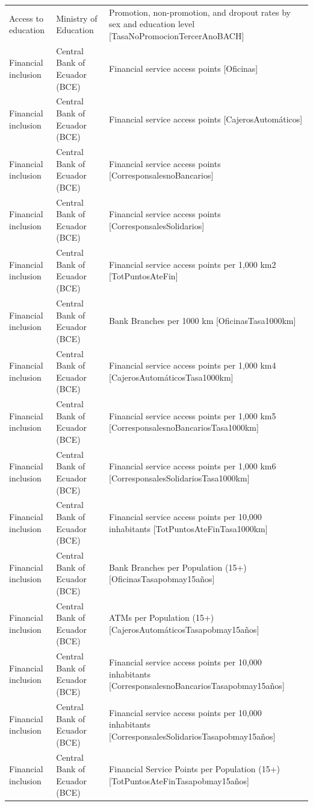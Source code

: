 \documentclass[10pt,a4paper]{article}
\begin{document}
\begin{longtable}{@{}>{\raggedright\arraybackslash}p{3.5cm}>{\raggedright\arraybackslash}p{5.6cm}>{\raggedright\arraybackslash}p{\dimexpr\textwidth-9.1cm-4\tabcolsep\relax}@{}}
Access to education & Ministry of Education & Promotion, non-promotion, and dropout rates by sex and education level [TasaNoPromocionTercerAnoBACH]\\
Financial inclusion & Central Bank of Ecuador (BCE) & Financial service access points [Oficinas]\\
Financial inclusion & Central Bank of Ecuador (BCE) & Financial service access points [CajerosAutom\'{a}ticos]\\
Financial inclusion & Central Bank of Ecuador (BCE) & Financial service access points [CorresponsalesnoBancarios]\\
Financial inclusion & Central Bank of Ecuador (BCE) & Financial service access points [CorresponsalesSolidarios]\\
Financial inclusion & Central Bank of Ecuador (BCE) & Financial service access points per 1,000 km2 [TotPuntosAteFin]\\
Financial inclusion & Central Bank of Ecuador (BCE) & Bank Branches per 1000 km [OficinasTasa1000km]\\
Financial inclusion & Central Bank of Ecuador (BCE) & Financial service access points per 1,000 km4 [CajerosAutom\'{a}ticosTasa1000km]\\
Financial inclusion & Central Bank of Ecuador (BCE) & Financial service access points per 1,000 km5 [CorresponsalesnoBancariosTasa1000km]\\
Financial inclusion & Central Bank of Ecuador (BCE) & Financial service access points per 1,000 km6 [CorresponsalesSolidariosTasa1000km]\\
Financial inclusion & Central Bank of Ecuador (BCE) & Financial service access points per 10,000 inhabitants [TotPuntosAteFinTasa1000km]\\
Financial inclusion & Central Bank of Ecuador (BCE) & Bank Branches per Population (15+) [OficinasTasapobmay15a\~{n}os]\\
Financial inclusion & Central Bank of Ecuador (BCE) & ATMs per Population (15+) [CajerosAutom\'{a}ticosTasapobmay15a\~{n}os]\\
Financial inclusion & Central Bank of Ecuador (BCE) & Financial service access points per 10,000 inhabitants [CorresponsalesnoBancariosTasapobmay15a\~{n}os]\\
Financial inclusion & Central Bank of Ecuador (BCE) & Financial service access points per 10,000 inhabitants [CorresponsalesSolidariosTasapobmay15a\~{n}os]\\
Financial inclusion & Central Bank of Ecuador (BCE) & Financial Service Points per Population (15+) [TotPuntosAteFinTasapobmay15a\~{n}os]\\

\end{longtable}
\end{document}
